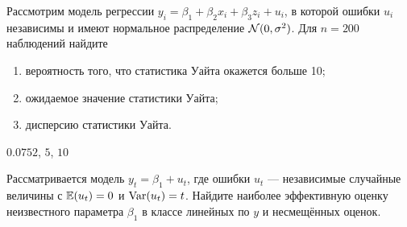 \begin{problem}
Рассмотрим модель регрессии $y_i=\beta_1+\beta_2 x_i + \beta_3 z_i+u_i$, в которой
ошибки $u_i$ независимы и имеют нормальное распределение $\mathcal{N}(0,\sigma^2)$. 
Для $n = 200$ наблюдений найдите
\begin{enumerate}
\item вероятность того, что статистика Уайта окажется больше 10;
\item ожидаемое значение статистики Уайта;
\item дисперсию статистики Уайта.
\end{enumerate}


\begin{sol}
$0.0752$, $5$, $10$
\end{sol}
\end{problem}


\begin{problem}
Рассматривается модель $y_t=\beta_1+u_t$, где ошибки $u_t$  — независимые
случайные величины с $\operatorname{\mathbb{E}}(u_t)=0$ и $\operatorname{Var}(u_t)=t$. Найдите наиболее эффективную
оценку неизвестного параметра $\beta_1$ в классе линейных по $y$ и несмещённых оценок.

\begin{sol}
\end{sol}
\end{problem}

